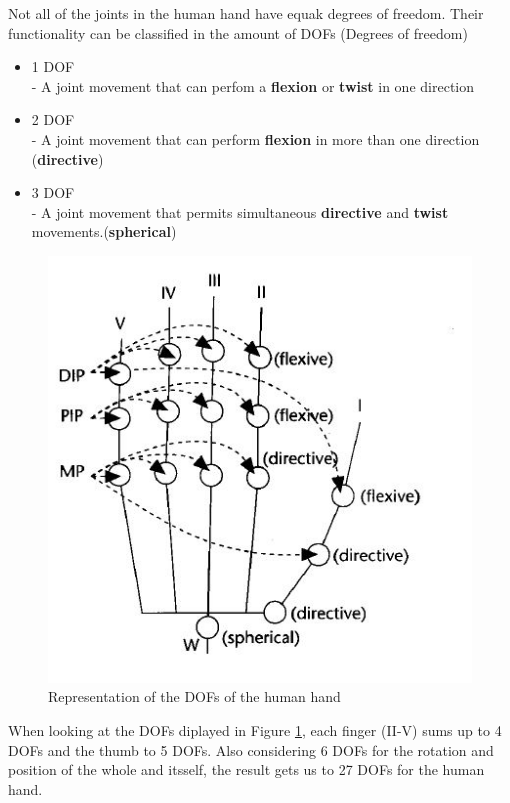 Not all of the joints in the human hand have equak degrees of freedom. Their functionality can be classified in the amount of DOFs (Degrees of freedom)\cite{KOREIN.1985}
\begin{itemize}
\item 1 DOF \\
	- A joint movement that can perfom a \textbf{flexion} or \textbf{twist} in one direction
\item 2 DOF \\
	- A joint movement that can perform \textbf{flexion} in more than one direction (\textbf{directive})
\item 3 DOF\\
	- A joint movement that permits simultaneous \textbf{directive} and \textbf{twist} movements.(\textbf{spherical})
\end{itemize}
\begin{figure}[H]
\includegraphics[scale=0.8]{images/Hand_DOFs.JPG} 
\caption{Representation of the DOFs of the human hand}
\label{dof_image} 
\end{figure}
When looking at the DOFs diplayed in Figure \ref{dof_image}, each finger (II-V) sums up to 4 DOFs and the thumb to 5 DOFs. Also considering 6 DOFs for the rotation and position of the whole and itsself, the result gets us to 27 DOFs  for the human hand.
